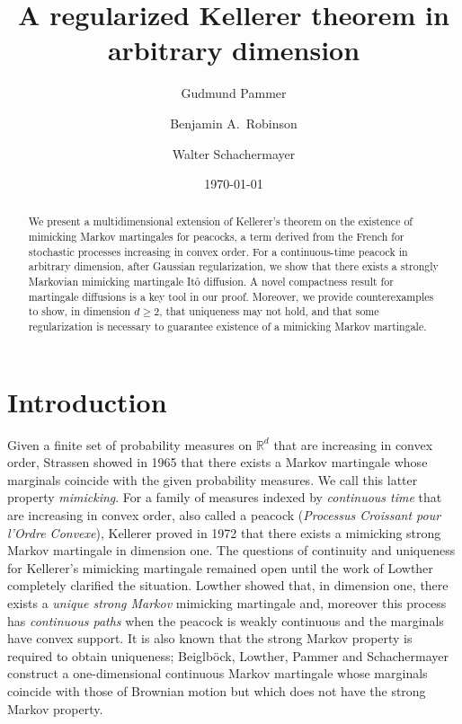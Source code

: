 \documentclass[12pt,oneside]{amsart}
\author{Gudmund Pammer}
\author{Benjamin A.\ Robinson}
\author{Walter Schachermayer}
\date{\today}
\theoremstyle{definition}
\newcommand{\R}{\mathbb R}
\def\R{{\mathbb R}}
\numberwithin{equation}{section}
\begin{document}
\title{A regularized Kellerer theorem in arbitrary dimension}


\begin{abstract}
We present a multidimensional extension of Kellerer's theorem on the existence of mimicking Markov martingales for peacocks, a term derived from the French for stochastic processes increasing in convex order. For a continuous-time peacock in arbitrary dimension, after Gaussian regularization, we show that there exists a strongly Markovian mimicking martingale It\^o diffusion. A novel compactness result for martingale diffusions is a key tool in our proof. Moreover, we provide counterexamples to show, in dimension $d \geq 2$, that uniqueness may not hold, and that some regularization is necessary to guarantee existence of a mimicking Markov martingale.
\end{abstract}

\maketitle

\section{Introduction}\label{sec:intro}

Given a finite set of probability measures on $\R^d$ that are increasing in convex order, Strassen \cite{St65} showed in 1965 that there exists a Markov martingale whose marginals coincide with the given probability measures. We call this latter property \emph{mimicking}. For a family of measures indexed by \emph{continuous time} that are increasing in convex order, also called a peacock (\emph{Processus Croissant pour l'Ordre Convexe}), Kellerer \cite{Ke72} proved in 1972 that there exists a mimicking strong Markov martingale in dimension one. The questions of continuity and uniqueness for Kellerer's mimicking martingale remained open until the work of Lowther \cite{Lo08b, Lo08a, Lo08d, Lo09, Lo08c} completely clarified the situation. Lowther showed that, in dimension one, there exists a \emph{unique strong Markov} mimicking martingale and, moreover this process has \emph{continuous paths} when the peacock is weakly continuous and the marginals have convex support. It is also known that the strong Markov property is required to obtain uniqueness; Beiglb\"ock, Lowther, Pammer and Schachermayer \cite{BePaSc21a} construct a one-dimensional continuous Markov martingale whose marginals coincide with those of Brownian motion but which does not have the strong Markov property.
\end{document}
